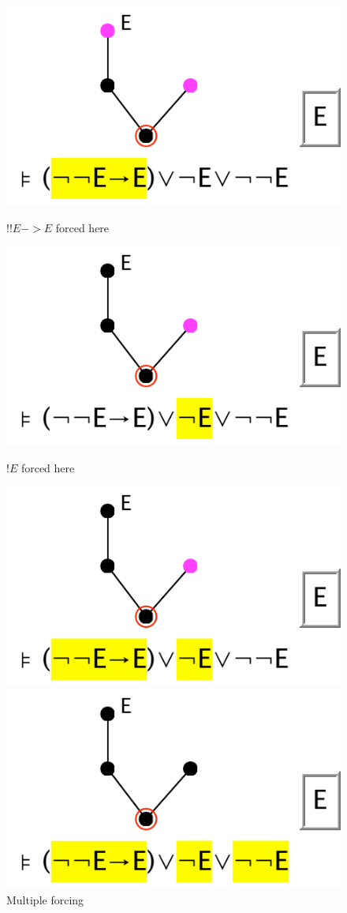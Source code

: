 \documentclass[11pt]{article}
\begin{document}
\begin{figure}
{\includegraphics[scale=0.6]{pics/samuels2}
\caption{$!!E->E$ forced here}
\label{fig:samuels2}
}
\qquad
\parbox{150pt}{\centering
\includegraphics[scale=0.6]{pics/samuels3}
\caption{$!E$ forced here}
\label{fig:samuels3}
}
\parbox{150pt}{\centering
\includegraphics[scale=0.6]{pics/samuels4}
\caption{Multiple forcing}
\label{fig:samuels4}
}
\qquad
\parbox{150pt}{\centering
\includegraphics[scale=0.6]{pics/samuels5}
}
\end{figure}
\end{document}
